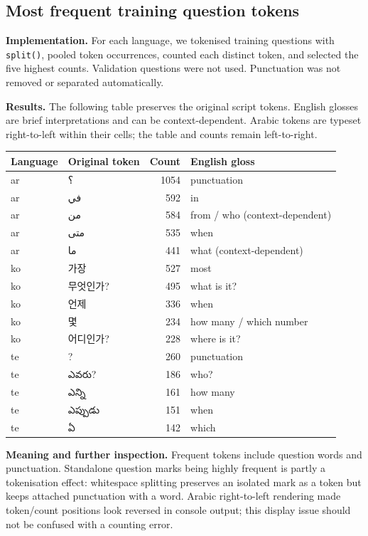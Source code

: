 \documentclass[11pt,a4paper]{article}
\newcommand{\AR}[1]{{\arabicfont\beginR #1\endR}}
\newcommand{\KO}[1]{{\koreanfont #1}}
\newcommand{\TE}[1]{{\telugufont #1}}
\begin{document}
\subsection{Most frequent training question tokens}
\textbf{Implementation.} For each language, we tokenised training questions with \texttt{split()}, pooled token occurrences, counted each distinct token, and selected the five highest counts. Validation questions were not used. Punctuation was not removed or separated automatically.

\textbf{Results.} The following table preserves the original script tokens. English glosses are brief interpretations and can be context-dependent. Arabic tokens are typeset right-to-left within their cells; the table and counts remain left-to-right.
\begin{center}
\small
\begin{tabular}{llrl}
\toprule
Language & Original token & Count & English gloss \\
\midrule
ar & \AR{؟} & 1054 & punctuation \\
ar & \AR{في} & 592 & in \\
ar & \AR{من} & 584 & from / who (context-dependent) \\
ar & \AR{متى} & 535 & when \\
ar & \AR{ما} & 441 & what (context-dependent) \\
\midrule
ko & \KO{가장} & 527 & most \\
ko & \KO{무엇인가?} & 495 & what is it? \\
ko & \KO{언제} & 336 & when \\
ko & \KO{몇} & 234 & how many / which number \\
ko & \KO{어디인가?} & 228 & where is it? \\
\midrule
te & ? & 260 & punctuation \\
te & \TE{ఎవరు?} & 186 & who? \\
te & \TE{ఎన్ని} & 161 & how many \\
te & \TE{ఎప్పుడు} & 151 & when \\
te & \TE{ఏ} & 142 & which \\
\bottomrule
\end{tabular}
\end{center}

\textbf{Meaning and further inspection.} Frequent tokens include question words and punctuation. Standalone question marks being highly frequent is partly a tokenisation effect: whitespace splitting preserves an isolated mark as a token but keeps attached punctuation with a word. Arabic right-to-left rendering made token/count positions look reversed in console output; this display issue should not be confused with a counting error.
\end{document}
